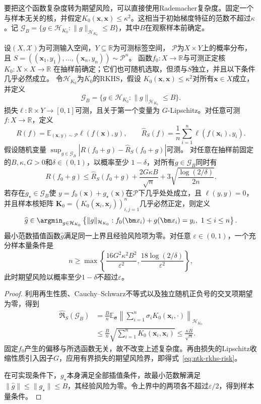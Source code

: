 要把这个函数复杂度转为期望风险，可以直接使用Rademacher复杂度。固定一个与样本无关的核，并假定$K_0(\bm x,\bm x)\leq\kappa^2$。这相当于初始梯度特征的范数不超过$\kappa$。记
$\mathcal G_B=\{g\in\mathcal H_{K_0}:\|g\|_{\mathcal H_{K_0}}\leq B\}$，其中$B$在观察样本前确定。

\begin{theorem}[初始梯度特征的期望风险界]
\label{thm:ntk-rkhs-risk}
设$(X,\mathcal X)$为可测输入空间，$Y\subseteq\mathbb R$为可测标签空间，
$\mathcal P$为$X\times Y$上的概率分布，且
$S=((\bm x_1,y_1),\ldots,(\bm x_n,y_n))\sim\mathcal P^n$。
函数$f_0:X\to\mathbb R$与可测正定核$K_0:X\times X\to\mathbb R$
在抽样前确定；它们也可随机选取，但须与$S$独立，并且以下条件几乎必然成立。
令$\mathcal H_{K_0}$为$K_0$的RKHS，假设
$K_0(\bm x,\bm x)\leq\kappa^2$对所有$\bm x\in X$成立，并定义
\[
 \mathcal G_B=\{g\in\mathcal H_{K_0}:
                   \|g\|_{\mathcal H_{K_0}}\leq B\}.
\]
损失$\ell:\mathbb R\times Y\to[0,1]$可测，且关于第一个变量为
$G$-Lipschitz。对任意可测$f:X\to\mathbb R$，定义
\[
 R(f)=\mathbb E_{(\bm x,y)\sim\mathcal P}\ell(f(\bm x),y),\qquad
 \hat R_S(f)=\frac1n\sum_{i=1}^n\ell(f(\bm x_i),y_i).
\]
假设随机变量
$\sup_{g\in\mathcal G_B}|R(f_0+g)-\hat R_S(f_0+g)|$可测。
对任意在抽样前固定的$B,\kappa,G>0$和$\delta\in(0,1)$，以概率至少
$1-\delta$，对所有$g\in\mathcal G_B$同时有
\begin{equation}
 R(f_0+g)\leq\hat R_S(f_0+g)
       +\frac{2G\kappa B}{\sqrt n}
       +3\sqrt{\frac{\log(2/\delta)}{2n}}.
 \label{eq:ntk-rkhs-risk}
\end{equation}
若存在$g_\star\in\mathcal G_B$使
$y=f_0(\bm x)+g_\star(\bm x)$在$\mathcal P$下几乎处处成立，且
$\ell(y,y)=0$，并且样本核矩阵
$\bm K_0=(K_0(\bm x_i,\bm x_j))_{i,j=1}^n$几乎必然正定，则定义
\[
 \widehat g\in\argmin_{g\in\mathcal H_{K_0}}
 \left\{\|g\|_{\mathcal H_{K_0}}:
 f_0(\bm x_i)+g(\bm x_i)=y_i,\ 1\leq i\leq n\right\}.
\]
最小范数插值函数$\widehat g$满足同一上界且经验风险项为零。对任意
$\varepsilon\in(0,1)$，一个充分样本量条件是
\[
 n\geq\max\left\{\frac{16G^2\kappa^2B^2}{\varepsilon^2},
                  \frac{18\log(2/\delta)}{\varepsilon^2}\right\},
\]
此时期望风险以概率至少$1-\delta$不超过$\varepsilon$。
\end{theorem}
\begin{proof}
利用再生性质、Cauchy--Schwarz不等式以及独立随机正负号的交叉项期望为零，得到
\begin{align*}
 \widehat{\mathfrak R}_S(\mathcal G_B)
 &=\frac Bn\mathbb E_{\bm\sigma}
       \left\|\sum_{i=1}^n\sigma_i K_0(\bm x_i,\cdot)\right\|_{\mathcal H_{K_0}}\\
 &\leq\frac Bn\sqrt{\sum_{i=1}^nK_0(\bm x_i,\bm x_i)}
 \leq\frac{\kappa B}{\sqrt n}.
\end{align*}
固定$f_0$产生的偏移与所选函数无关，故不改变上述复杂度。再由损失的Lipschitz收缩性质引入因子$G$，应用有界损失的期望风险界，即得式~\eqref{eq:ntk-rkhs-risk}。

在可实现条件下，$g_\star$本身满足全部插值条件，故最小范数解满足$\|\widehat g\|\leq\|g_\star\|\leq B$，其经验风险为零。令上界中的两项各不超过$\varepsilon/2$，得到样本量条件。
\end{proof}

